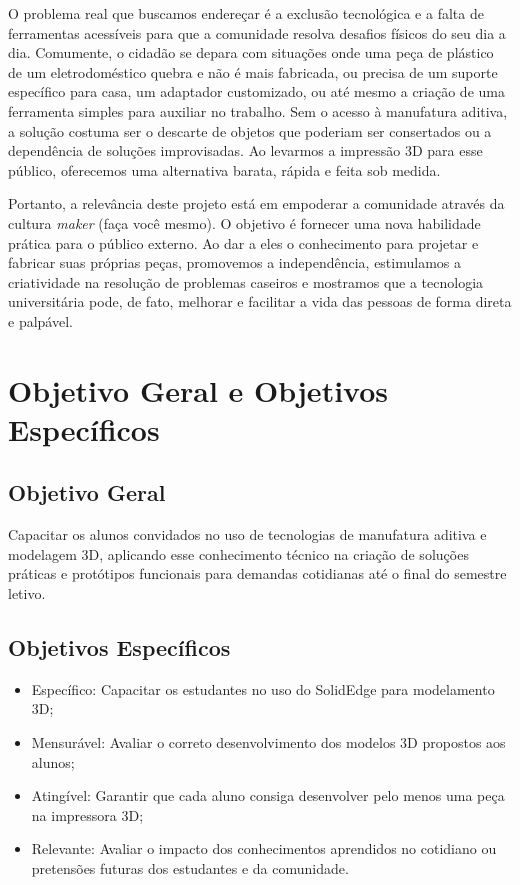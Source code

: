 \documentclass[12pt, a4paper]{article}
\begin{document}
O problema real que buscamos endereçar é a exclusão tecnológica e a falta de ferramentas acessíveis para que a comunidade resolva desafios físicos do seu dia a dia. Comumente, o cidadão se depara com situações onde uma peça de plástico de um eletrodoméstico quebra e não é mais fabricada, ou precisa de um suporte específico para casa, um adaptador customizado, ou até mesmo a criação de uma ferramenta simples para auxiliar no trabalho. Sem o acesso à manufatura aditiva, a solução costuma ser o descarte de objetos que poderiam ser consertados ou a dependência de soluções improvisadas. Ao levarmos a impressão 3D para esse público, oferecemos uma alternativa barata, rápida e feita sob medida.

Portanto, a relevância deste projeto está em empoderar a comunidade através da cultura \textit{maker} (faça você mesmo). O objetivo é fornecer uma nova habilidade prática para o público externo. Ao dar a eles o conhecimento para projetar e fabricar suas próprias peças, promovemos a independência, estimulamos a criatividade na resolução de problemas caseiros e mostramos que a tecnologia universitária pode, de fato, melhorar e facilitar a vida das pessoas de forma direta e palpável.

\section{Objetivo Geral e Objetivos Específicos}
\subsection{Objetivo Geral}
Capacitar os alunos convidados no uso de tecnologias de manufatura aditiva e modelagem 3D, aplicando esse conhecimento técnico na criação de soluções práticas e protótipos funcionais para demandas cotidianas até o final do semestre letivo.

\subsection{Objetivos Específicos}
\begin{itemize}
    \item Específico: Capacitar os estudantes no uso do SolidEdge para modelamento 3D;
    \item Mensurável: Avaliar o correto desenvolvimento dos modelos 3D propostos aos alunos;
    \item Atingível: Garantir que cada aluno consiga desenvolver pelo menos uma peça na impressora 3D;
    \item Relevante: Avaliar o impacto dos conhecimentos aprendidos no cotidiano ou pretensões futuras dos estudantes e da comunidade.
\end{itemize}
\end{document}
